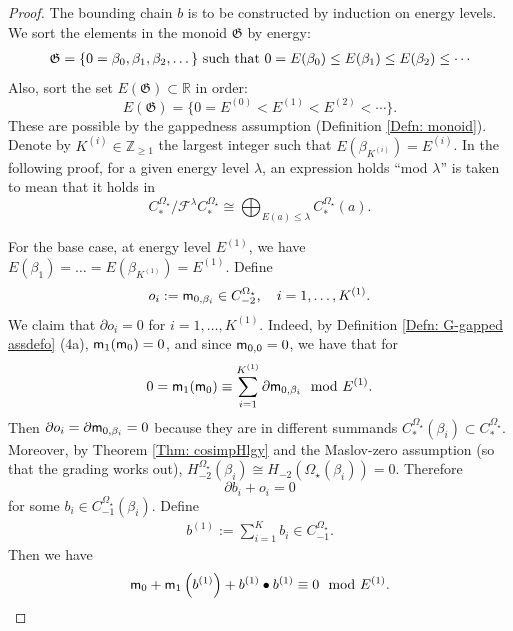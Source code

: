 \documentclass[10pt]{amsart}
\numberwithin{equation}{section}
\theoremstyle{plain}
\theoremstyle{definition}
\theoremstyle{remark}
\numberwithin{equation}{section}
\newcommand{\R}{\mathbb{R}}
\newcommand{\Z}{\mathbb{Z}}
\newcommand{\mf}[1]{\mathfrak{#1}}
\newcommand{\ms}[1]{\mathscr{#1}}
\newcommand{\CBa}{C_*^{\Omega_\star}}
\newcommand{\Cba}[1]{C_{#1}^{\Omega_\star}}
\newcommand{\Hba}[1]{H_{#1}^{\Omega_\star}}
\newcommand{\mm}{\textup{\textsf{m}}}
\begin{document}
{\begin{proof}
	The bounding chain $b$ is to be constructed by induction on energy levels.
	We sort the elements in the monoid $\mf{G}$ by energy:
	\begin{align*}
		\mf{G} = \{0=\beta_0,\beta_1,\beta_2,\dots \}\textup{ such that } 0=E(\beta_0)\leq E(\beta_1)\leq E(\beta_2)\leq \cdots
	\end{align*}
	Also, sort the set  $E(\mathfrak{G})\subset \R$ in order:
	\[ E(\mf{G})= \{0=E^{(0)}<E^{(1)}<E^{(2)}<\cdots\}.\] 
	These are possible by the gappedness assumption (Definition \ref{Defn: monoid}).
	Denote by $K^{(i)}\in \Z_{\geq 1}$ the largest integer such that $E(\beta_{K^{(i)}})=E^{(i)}$.
	In the following proof, for a given energy level $\lambda$, an expression holds ``mod $\lambda$'' is taken to mean that it holds in \[\CBa/\ms{F}^{\lambda}\CBa\cong \bigoplus_{E(a)\leq \lambda} \CBa(a).\]
	
	


	For the base case, at energy level $E^{(1)}$,  we have $E(\beta_1)=\dots =E(\beta_{K^{(1)}})=E^{(1)}$. 
	Define 
	\begin{align*}
		o_i:= \mm_{0,\beta_i}\in \Cba{-2},\quad i=1,\dots, K^{(1)}.
	\end{align*}
	We claim that $\partial o_i=0$ for $i=1,\dots, K^{(1)}$. 
	Indeed, by Definition \ref{Defn: G-gapped assdefo} (4a), $\mm_1(\mm_0) = 0$, and since $\mm_{0,0}=0$, we have that for 
	\begin{align*}
		0=\mm_1(\mm_0) \equiv  \sum_{i=1}^{K^{(1)}}\partial \mm_{0,\beta_i}  \mod E^{(1)}.
	\end{align*}
	Then $\partial o_i=\partial \mm_{0,\beta_i} =0$ because they are in different summands $\Cba{*}(\beta_i)\subset \CBa$.
Moreover, by Theorem \ref{Thm: cosimpHlgy} and the Maslov-zero assumption (so that the grading works out), $\Hba{-2}(\beta_i)\cong H_{-2}(\Omega_\star (\beta_i))=0$. Therefore \[\partial b_i+o_i = 0\] for some $b_i\in \Cba{-1}(\beta_i)$. Define
\begin{align*}
	b^{(1)}:= \sum_{i=1}^K b_i\in \Cba{-1}.
\end{align*}
Then we have \begin{align*}
	\mm_0 + \mm_1\left(b^{(1)}\right) + b^{(1)}\bullet b^{(1)} \equiv 0 \mod E^{(1)}.
\end{align*}
	

\end{proof}}
\end{document}
